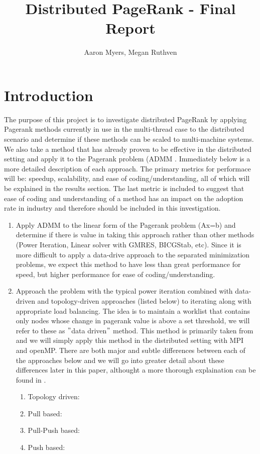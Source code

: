 \documentclass[letterpaper,12pt,onecolumn]{article}
\title{Distributed PageRank - Final Report}
\author{Aaron Myers, Megan Ruthven}
\begin{document}
\maketitle
\tableofcontents
\pagebreak
\section{Introduction}
The purpose of this project is to investigate distributed PageRank by applying Pagerank methods currently in use in the multi-thread case to the distributed scenario and determine if these methods can be scaled to multi-machine systems. We also take a method that has already proven to be effective in the distributed setting and apply it to the Pagerank problem (ADMM \cite{ADMM}. Immediately below is a more detailed description of each approach. The primary metrics for performace will be: speedup, scalability, and ease of coding/understanding, all of which will be explained in the results section. The last metric is included to suggest that ease of coding and understanding of a method has an impact on the adoption rate in industry and therefore should be included in this investigation.
\begin{enumerate}
\item Apply ADMM \cite{ADMM} to the linear form of the Pagerank problem (Ax=b) and determine if there is value in taking this approach rather than other methods (Power Iteration, Linear solver with GMRES, BICGStab, etc). Since it is more difficult to apply a data-drive approach to the separated minimization problems, we expect this method to have less than great performance for speed, but higher performance for ease of coding/understanding.

\item Approach the problem with the typical power iteration combined with data-driven and topology-driven approaches (listed below) to iterating along with appropriate load balancing. The idea is to maintain a worklist that contains only nodes whose change in pagerank value is above a set threshold, we will refer to these as $"$data driven$"$ method. This method is primarily taken from \cite{Joyce} and we will simply apply this method in the distributed setting with MPI and openMP. There are both major and subtle differences between each of the approaches below and we will go into greater detail about these differences later in this paper, althought a more thorough explaination can be found in \cite{Joyce}.
  \begin{enumerate}
	 \item Topology driven:
	 \item Pull based:
	 \item Pull-Push based:
	\item Push based: 
  \end{enumerate}
\end{enumerate}
\end{document}
